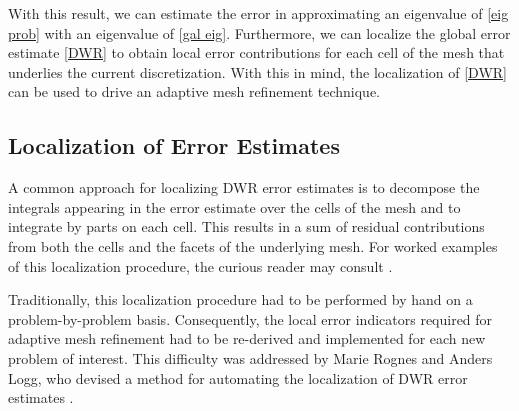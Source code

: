 With this result, we can estimate the error in approximating an eigenvalue of \eqref{eig prob} with an eigenvalue of \eqref{gal eig}. Furthermore, we can localize the global error estimate \eqref{DWR} to obtain local error contributions for each cell of the mesh that underlies the current discretization. With this in mind, the localization of \eqref{DWR} can be used to drive an adaptive mesh refinement technique. 




\subsection{Localization of Error Estimates}


A common approach for localizing DWR error estimates is to decompose the integrals appearing in the error estimate over the cells of the mesh and to integrate by parts on each cell. This results in a sum of residual contributions from both the cells and the facets of the underlying mesh.  For worked examples of this localization procedure, the curious reader may consult \cite{Bangerth, Heuveline, logg, joe}. 


Traditionally, this localization procedure had to be performed by hand on a problem-by-problem basis. Consequently, the local error indicators required for adaptive mesh refinement had to be re-derived and implemented for each new problem of interest. This difficulty was addressed by Marie Rognes and Anders Logg, who devised a method for automating the localization of DWR error estimates \cite{logg}. 


